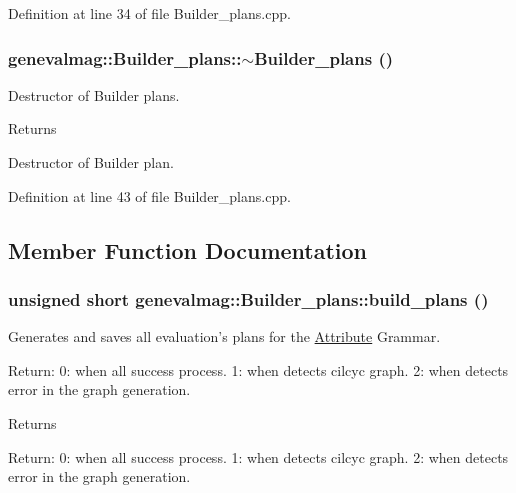 Definition at line 34 of file Builder\_\-plans.cpp.

\hypertarget{classgenevalmag_1_1Builder__plans_af19ca3bf57580ee40b317e119cacdc66}{
\subsubsection[{$\sim$Builder\_\-plans}]{\setlength{\rightskip}{0pt plus 5cm}genevalmag::Builder\_\-plans::$\sim$Builder\_\-plans ()}}
\label{classgenevalmag_1_1Builder__plans_af19ca3bf57580ee40b317e119cacdc66}
Destructor of Builder plans. \begin{DoxyReturn}{Returns}

\end{DoxyReturn}
Destructor of Builder plan. 

Definition at line 43 of file Builder\_\-plans.cpp.



\subsection{Member Function Documentation}
\hypertarget{classgenevalmag_1_1Builder__plans_a3337ccac1c358d9b0a1de456ff74b0cb}{
\subsubsection[{build\_\-plans}]{\setlength{\rightskip}{0pt plus 5cm}unsigned short genevalmag::Builder\_\-plans::build\_\-plans ()}}
\label{classgenevalmag_1_1Builder__plans_a3337ccac1c358d9b0a1de456ff74b0cb}
Generates and saves all evaluation's plans for the \hyperlink{classgenevalmag_1_1Attribute}{Attribute} Grammar.

Return: 0: when all success process. 1: when detects cilcyc graph. 2: when detects error in the graph generation. \begin{DoxyReturn}{Returns}

\end{DoxyReturn}
Return: 0: when all success process. 1: when detects cilcyc graph. 2: when detects error in the graph generation. 


